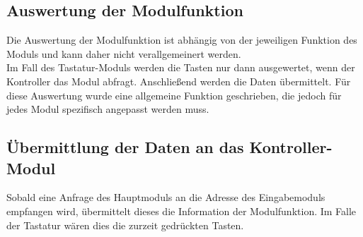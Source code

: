 


\subsection{Auswertung der Modulfunktion}
Die Auswertung der Modulfunktion ist abhängig von der jeweiligen Funktion des Moduls und kann daher nicht verallgemeinert werden.\\
Im Fall des Tastatur-Moduls werden die Tasten nur dann ausgewertet, wenn der Kontroller das Modul abfragt. Anschließend werden die Daten übermittelt. Für diese Auswertung wurde eine allgemeine Funktion geschrieben, die jedoch für jedes Modul spezifisch angepasst werden muss.\\



\subsection{Übermittlung der Daten an das Kontroller-Modul}
Sobald eine Anfrage des Hauptmoduls an die Adresse des Eingabemoduls empfangen wird, übermittelt dieses die Information der Modulfunktion. Im Falle der Tastatur wären dies die zurzeit gedrückten Tasten.

